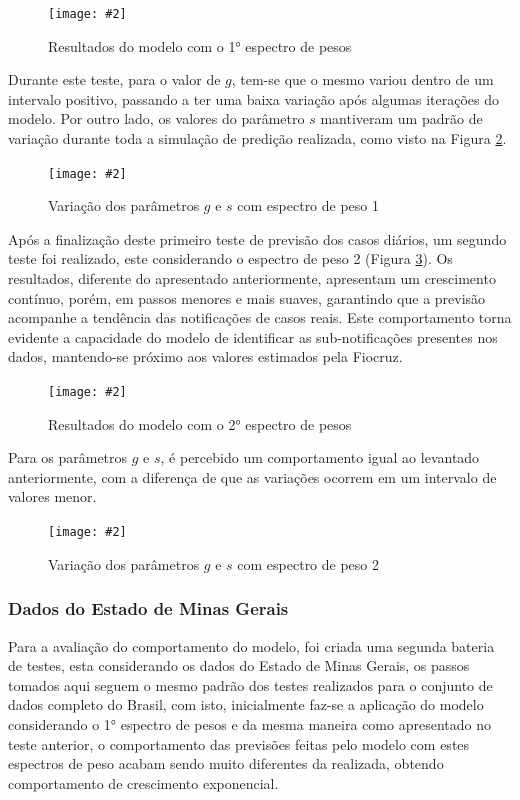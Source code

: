 \documentclass[a4paper,12pt]{article}
\newcommand{\image}[4]{
    \begin{figure}[H]%
        \begin{center}
        \caption{#3}
        \texttt{[image: \#2]}
        \label{#4}
        \end{center}
    \end{figure}
}
\begin{document}
\image{0.85}{images/modelo/pais/estimativa_Brasil_1.png}{Resultados do modelo com o 1° espectro de pesos}{figure:model_country1}

\par Durante este teste, para o valor de $g$, tem-se que o mesmo variou dentro de um intervalo positivo, passando a ter uma baixa variação após algumas iterações do modelo. Por outro lado, os valores do parâmetro $s$ mantiveram um padrão de variação durante toda a simulação de predição realizada, como visto na Figura \ref{figure:model_country1gs}.

\image{0.75}{images/modelo/pais/gs_modelo_Brasil_1.png}{Variação dos parâmetros $g$ e $s$ com espectro de peso 1}{figure:model_country1gs}

\par Após a finalização deste primeiro teste de previsão dos casos diários, um segundo teste foi realizado, este considerando o espectro de peso 2 (Figura \ref{figure:model_country2}). Os resultados, diferente do apresentado anteriormente, apresentam um crescimento contínuo, porém, em passos menores e mais suaves, garantindo que a previsão acompanhe a tendência das notificações de casos reais. Este comportamento torna evidente a capacidade do modelo de identificar as sub-notificações presentes nos dados, mantendo-se próximo aos valores estimados pela Fiocruz.

\image{0.85}{images/modelo/pais/estimativa_Brasil_2.png}{Resultados do modelo com o 2° espectro de pesos}{figure:model_country2}

\par Para os parâmetros $g$ e $s$, é percebido um comportamento igual ao levantado anteriormente, com a diferença de que as variações ocorrem em um intervalo de valores menor.

\image{0.75}{images/modelo/pais/gs_modelo_Brasil_2.png}{Variação dos parâmetros $g$ e $s$ com espectro de peso 2}{figure:model_country2gs}

\subsubsection{Dados do Estado de Minas Gerais}

\par Para a avaliação do comportamento do modelo, foi criada uma segunda bateria de testes, esta considerando os dados do Estado de Minas Gerais, os passos tomados aqui seguem o mesmo padrão dos testes realizados para o conjunto de dados completo do Brasil, com isto, inicialmente faz-se a aplicação do modelo considerando o 1° espectro de pesos e da mesma maneira como apresentado no teste anterior, o comportamento das previsões feitas pelo modelo com estes espectros de peso acabam sendo muito diferentes da realizada, obtendo comportamento de crescimento exponencial.
\end{document}
